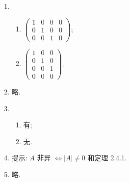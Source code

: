 % 
\begin{enumerate}
    \item %
        \begin{enumerate}[(1)]
            \item %
                $
                    \left(
                        \begin{array}{cccc}
                            1 & 0 & 0 & 0 \\
                            0 & 1 & 0 & 0\\
                            0 & 0 & 1 & 0
                        \end{array}
                    \right)
                $;
            \item %
                $
                    \left(
                        \begin{array}{ccc}
                            1 & 0 & 0 \\
                            0 & 1 & 0 \\
                            0 & 0 & 1 \\
                            0 & 0 & 0
                        \end{array}
                    \right)
                $.
        \end{enumerate}
    \item %
        略.
    \item %
        \begin{enumerate}[(1)]
            \item %
                有;
            \item %
                无.
        \end{enumerate}
    \item %
        提示: $A$ 非异 $\Leftrightarrow |A| \ne 0$ 和定理 2.4.1.
    \item %
        略.
\end{enumerate}
% 
